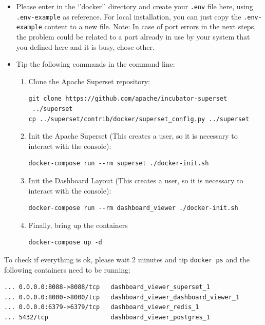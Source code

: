 \documentclass[]{book}
\begin{document}
\begin{itemize}
\item
  Please enter in the `'docker'' directory and create your \texttt{.env}
  file here, using \texttt{.env-example} as reference. For local
  installation, you can just copy the \texttt{.env-example} content to a
  new file. Note: In case of port errors in the next steps, the problem
  could be related to a port already in use by your system that you
  defined here and it is busy, chose other.
\item
  Tip the following commands in the command line:

  \begin{enumerate}
  \def\labelenumi{\arabic{enumi}.}
  \item
    Clone the Apache Superset repository:

\begin{verbatim}
git clone https://github.com/apache/incubator-superset
 ../superset
cp ../superset/contrib/docker/superset_config.py ../superset
\end{verbatim}
  \item
    Init the Apache Superset (This creates a user, so it is necessary to
    interact with the console):

\begin{verbatim}
docker-compose run --rm superset ./docker-init.sh
\end{verbatim}
  \item
    Init the Dashboard Layout (This creates a user, so it is necessary
    to interact with the console):

\begin{verbatim}
docker-compose run --rm dashboard_viewer ./docker-init.sh
\end{verbatim}
  \item
    Finally, bring up the containers

\begin{verbatim}
docker-compose up -d
\end{verbatim}
  \end{enumerate}
\end{itemize}

To check if everything is ok, please wait 2 minutes and tip
\texttt{docker\ ps} and the following containers need to be running:

\begin{verbatim}
... 0.0.0.0:8088->8088/tcp   dashboard_viewer_superset_1
... 0.0.0.0:8000->8000/tcp   dashboard_viewer_dashboard_viewer_1
... 0.0.0.0:6379->6379/tcp   dashboard_viewer_redis_1
... 5432/tcp                 dashboard_viewer_postgres_1
\end{verbatim}
\end{document}

